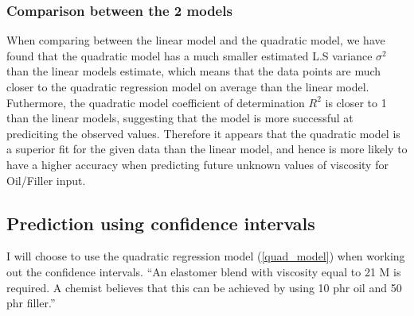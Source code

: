 \documentclass[12pt]{article}
\begin{document}
\subsubsection{Comparison between the 2 models}
When comparing between the linear model and the quadratic model, we have found that the quadratic model has a much smaller estimated L.S variance $\sigma^2$ than the linear models estimate, which means that the data points are much closer to the quadratic regression model on average than the linear model. Futhermore, the quadratic model coefficient of determination $R^2$ is closer to 1 than the linear models, suggesting that the model is more successful at prediciting the observed values. Therefore it appears that the quadratic model is a superior fit for the given data than the linear model, and hence is more likely to have a higher accuracy when predicting future unknown values of viscosity for Oil/Filler input.


\subsection{Prediction using confidence intervals}
I will choose to use the quadratic regression model (\ref{quad_model}) when working out the confidence intervals. \enquote{An elastomer blend with viscosity equal to 21 M is required. A chemist believes that this can be achieved by using 10 phr oil and 50 phr filler.}
\end{document}
